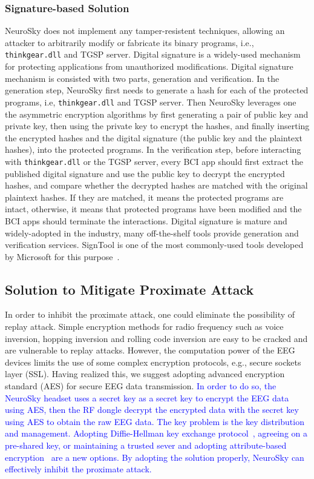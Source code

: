\subsubsection{Signature-based Solution}
NeuroSky does not implement any tamper-resistent techniques, allowing an attacker to arbitrarily modify or fabricate its binary programs, i.e., \texttt{thinkgear.dll} and TGSP server. Digital signature is a widely-used mechanism for protecting applications from unauthorized modifications. Digital signature mechanism is consisted with two parts, generation and verification. In the generation step, NeuroSky first needs to generate a hash for each of the protected programs, i.e, \texttt{thinkgear.dll} and TGSP server. Then NeuroSky leverages one the asymmetric encryption algorithms by first generating a pair of public key and private key, then using the private key to encrypt the hashes, and finally inserting the encrypted hashes and the digital signature (the public key and the plaintext hashes), into the protected programs. In the verification step, before interacting with \texttt{thinkgear.dll} or the TGSP server, every BCI app should first extract the published digital signature and use the public key to decrypt the encrypted hashes, and compare whether the decrypted hashes are matched with the original plaintext hashes. If they are matched, it means the protected programs are intact, otherwise, it means that protected programs have been modified and the BCI apps should terminate the interactions. Digital signature is mature and widely-adopted in the industry, many off-the-shelf tools provide generation and verification services. SignTool is one of the most commonly-used tools developed by Microsoft for this purpose~\cite{signtool}.

\subsection{Solution to Mitigate Proximate Attack}
In order to inhibit the proximate attack, one could eliminate the possibility of replay attack. Simple encryption methods for radio frequency such as voice inversion, hopping inversion and rolling code inversion are easy to be cracked and are vulnerable to replay attacks. However, the computation power of the EEG devices limits the use of some complex encryption protocols, e.g., secure sockets layer (SSL). Having realized this, we suggest adopting advanced encryption standard (AES) for secure EEG data transmission. \textcolor{blue}{In order to do so, the NeuroSky headset uses a secret key as a secret key to encrypt the EEG data using AES, then the RF dongle decrypt the encrypted data with the secret key using AES to obtain the raw EEG data. The key problem is the key distribution and management. Adopting  Diffie-Hellman key exchange protocol~\cite{diffie1976new}, agreeing on a pre-shared key, or maintaining a trusted sever and adopting attribute-based encryption~\cite{bethencourt2007ciphertext} are a new options. By adopting the solution properly, NeuroSky can effectively inhibit the proximate attack.}

